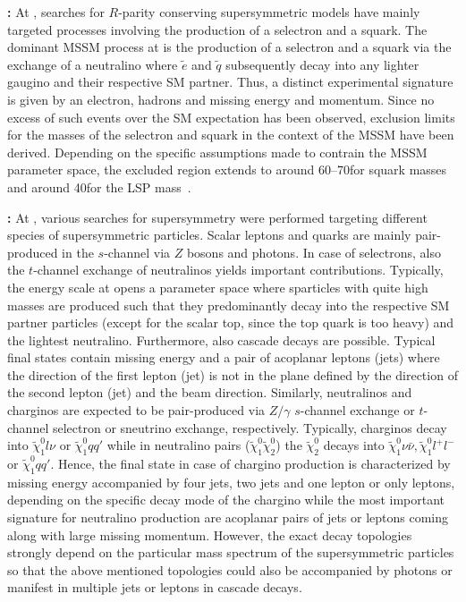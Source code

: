 \begin{description}
 \item \textbf{\hera:} At \hera, searches for $R$-parity conserving supersymmetric models have mainly targeted processes involving the production of a selectron and a squark. The dominant MSSM process at \hera is the production of a selectron and a squark via the exchange of a neutralino where $\tilde{e}$ and $\tilde{q}$ subsequently decay into any lighter gaugino and their respective SM partner. Thus, a distinct experimental signature is given by an electron, hadrons and missing energy and momentum. Since no excess of such events over the SM expectation has been observed, exclusion limits for the masses of the selectron and squark in the context of the MSSM have been derived. Depending on the specific assumptions made to contrain the MSSM parameter space, the excluded region extends to around 60--70\gev for squark masses and around 40\gev for the LSP mass~\cite{Aid:1996es, Breitweg:1998gk}. 
 \item \textbf{\lep:} At \lep, various searches for supersymmetry were performed targeting different species of supersymmetric particles. Scalar leptons and quarks are mainly pair-produced in the $s$-channel via $Z$ bosons and photons. In case of selectrons, also the $t$-channel exchange of neutralinos yields important contributions. Typically, the energy scale at \lep opens a parameter space where sparticles with quite high masses are produced such that they predominantly decay into the respective SM partner particles (except for the scalar top, since the top quark is too heavy) and the lightest neutralino. Furthermore, also cascade decays are possible. Typical final states contain missing energy and a pair of acoplanar leptons (jets) where the direction of the first lepton (jet) is not in the plane defined by the direction of the second lepton (jet) and the beam direction. Similarly, neutralinos and charginos are expected to be pair-produced via $Z/\gamma$ $s$-channel exchange or $t$-channel selectron or sneutrino exchange, respectively. Typically, charginos decay into $\tilde{\chi}_{1}^{0}l\nu$ or $\tilde{\chi}_{1}^{0} qq'$ while in neutralino pairs ($\tilde{\chi}_{1}^{0}\tilde{\chi}_{2}^{0}$) the $\tilde{\chi}_{2}^{0}$ decays into $\tilde{\chi}_{1}^{0} \nu \bar{\nu}, \tilde{\chi}_{1}^{0} l^+ l^-$ or $\tilde{\chi}_{1}^{0} qq'$. Hence, the final state in case of chargino production is characterized by missing energy accompanied by four jets, two jets and one lepton or only leptons, depending on the specific decay mode of the chargino while the most important signature for neutralino production are acoplanar pairs of jets or leptons coming along with large missing momentum. However, the exact decay topologies strongly depend on the particular mass spectrum of the supersymmetric particles so that the above mentioned topologies could also be accompanied by photons or manifest in multiple jets or leptons in cascade decays. \\

\end{description}
